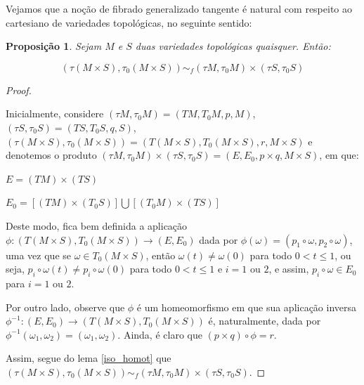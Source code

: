 \documentclass[12pt,oneside]{book} %
\newtheorem{prop}   {\hspace{0.5cm}Proposi\c c\~ao}[chapter]
\begin{document}
\par Vejamos que a noção de fibrado generalizado tangente é natural com respeito ao cartesiano de variedades topológicas, no seguinte sentido:

\begin{prop}\label{fht_tang_cart}
	Sejam $M$ e $S$ duas variedades topológicas quaisquer. Então:
	
	$$ (\tau (M\times S),\tau_{0}(M\times S))\sim_{f} (\tau M,\tau_{0}M)\times (\tau S,\tau_{0}S) $$
\end{prop}
\begin{proof}
	
	\
	
	\par Inicialmente, considere $(\tau M,\tau_{0}M)=(TM,T_{0}M,p,M)$, $(\tau S,\tau_{0}S)=(TS,T_{0}S,q,S)$, $(\tau (M\times S),\tau_{0}(M\times S))=(T(M\times S),T_{0}(M\times S),r,M\times S)$ e denotemos o produto $(\tau M,\tau_{0}M)\times (\tau S,\tau_{0}S)=(E,E_{0},p\times q,M\times S)$, em que: \newline
	
	$ E=(TM)\times(TS) $
	
	$ E_{0}=[(TM)\times (T_{0}S)]\bigcup [(T_{0}M)\times (TS)] $ \newline
	
	\par Deste modo, fica bem definida a aplicação $\phi:(T(M\times S),T_{0}(M\times S))\to (E,E_{0})$ dada por $\phi(\omega)=(p_{1}\circ\omega,p_{2}\circ\omega)$, uma vez que se $\omega\in T_{0}(M\times S)$, então $\omega(t)\neq \omega(0)$ para todo $0<t\leq 1$, ou seja, $p_{i}\circ\omega(t)\neq p_{i}\circ\omega(0)$ para todo $0<t\leq 1$ e $i=1$ ou $2$, e assim, $p_{i}\circ\omega\in E_{0}$ para $i=1$ ou $2$.
	
	\par Por outro lado, observe que $\phi$ é um homeomorfismo em que sua aplicação inversa $\phi^{-1}:(E,E_{0})\to (T(M\times S),T_{0}(M\times S))$ é, naturalmente, dada por $\phi^{-1}(\omega_{1},\omega_{2})=(\omega_{1},\omega_{2})$. Ainda, é claro que $(p\times q)\circ\phi=r$.
	
	\par Assim, segue do lema \ref{iso_homot} que $(\tau (M\times S),\tau_{0}(M\times S))\sim_{f} (\tau M,\tau_{0}M)\times (\tau S,\tau_{0}S)$.
	
\end{proof}



\end{document}
